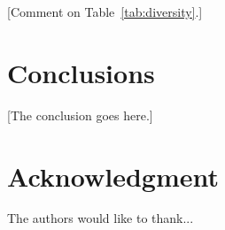\documentclass[10pt,conference]{IEEEtran}
\newcommand{\jef}[1]{\textcolor[rgb]{1,0,0}{[#1]}}
\begin{document}
\jef{Comment on Table~\ref{tab:diversity}.\vspace{3cm}}

\begin{table}[h!]
	\caption{Classification results by using ensemble methods in comparison with original deep features.}
	\label{tab:diversity}
\end{table}

\section{Conclusions}

\jef{The conclusion goes here.\vspace{7cm}}






\section*{Acknowledgment}


The authors would like to thank...






%
%





\end{document}
